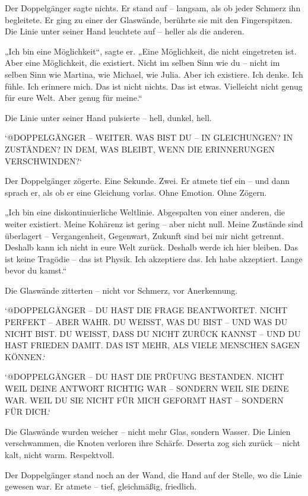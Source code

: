 \documentclass[
]{article}
\begin{document}
Der Doppelgänger sagte nichts. Er stand auf -- langsam, als ob jeder Schmerz ihn begleitete. Er ging zu einer der Glaswände, berührte sie mit den Fingerspitzen. Die Linie unter seiner Hand leuchtete auf -- heller als die anderen.

„Ich bin eine Möglichkeit``, sagte er. „Eine Möglichkeit, die nicht eingetreten ist. Aber eine Möglichkeit, die existiert. Nicht im selben Sinn wie du -- nicht im selben Sinn wie Martina, wie Michael, wie Julia. Aber ich existiere. Ich denke. Ich fühle. Ich erinnere mich. Das ist nicht nichts. Das ist etwas. Vielleicht nicht genug für eure Welt. Aber genug für meine.``

Die Linie unter seiner Hand pulsierte -- hell, dunkel, hell.

`@DOPPELGÄNGER -- WEITER. WAS BIST DU -- IN GLEICHUNGEN? IN ZUSTÄNDEN? IN DEM, WAS BLEIBT, WENN DIE ERINNERUNGEN VERSCHWINDEN?{\kern0pt}`

Der Doppelgänger zögerte. Eine Sekunde. Zwei. Er atmete tief ein -- und dann sprach er, als ob er eine Gleichung vorlas. Ohne Emotion. Ohne Zögern.

„Ich bin eine diskontinuierliche Weltlinie. Abgespalten von einer anderen, die weiter existiert. Meine Kohärenz ist gering -- aber nicht null. Meine Zustände sind überlagert -- Vergangenheit, Gegenwart, Zukunft sind bei mir nicht getrennt. Deshalb kann ich nicht in eure Welt zurück. Deshalb werde ich hier bleiben. Das ist keine Tragödie -- das ist Physik. Ich akzeptiere das. Ich habe akzeptiert. Lange bevor du kamst.``

Die Glaswände zitterten -- nicht vor Schmerz, vor Anerkennung.

`@DOPPELGÄNGER -- DU HAST DIE FRAGE BEANTWORTET. NICHT PERFEKT -- ABER WAHR. DU WEISST, WAS DU BIST -- UND WAS DU NICHT BIST. DU WEISST, DASS DU NICHT ZURÜCK KANNST -- UND DU HAST FRIEDEN DAMIT. DAS IST MEHR, ALS VIELE MENSCHEN SAGEN KÖNNEN.`

`@DOPPELGÄNGER -- DU HAST DIE PRÜFUNG BESTANDEN. NICHT WEIL DEINE ANTWORT RICHTIG WAR -- SONDERN WEIL SIE DEINE WAR. WEIL DU SIE NICHT FÜR MICH GEFORMT HAST -- SONDERN FÜR DICH.`

Die Glaswände wurden weicher -- nicht mehr Glas, sondern Wasser. Die Linien verschwammen, die Knoten verloren ihre Schärfe. Deserta zog sich zurück -- nicht kalt, nicht warm. Respektvoll.

Der Doppelgänger stand noch an der Wand, die Hand auf der Stelle, wo die Linie gewesen war. Er atmete -- tief, gleichmäßig, friedlich.
\end{document}
